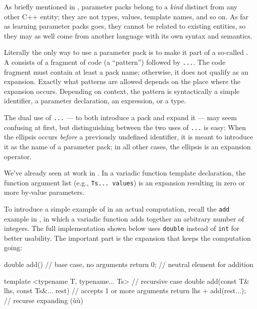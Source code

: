 As briefly mentioned in ,
parameter packs belong to a \emph{kind} distinct from any other C++
entity; they are not types, values, template names, and so on. As far as
learning parameter packs goes, they cannot be related to existing
entities, so they may as well come from another language with its own
syntax and semantics.

Literally the only way to use a parameter pack is to make it part of a
so-called . A  consists of
a fragment of code (a ``pattern'') followed by \lstinline!...!. The code
fragment must contain at least a pack name; otherwise, it does not
qualify as an expansion. Exactly what patterns are allowed depends on
the place where the expansion occurs. Depending on context, the pattern
is syntactically a simple identifier, a parameter declaration, an
expression, or a type.

The dual use of \lstinline!...! --- to both introduce a pack and expand it
--- may seem confusing at first, but distinguishing between the two uses
of \lstinline!...! is easy: When the ellipsis occurs \emph{before} a
previously undefined identifier, it is meant to introduce it as the name
of a parameter pack; in all other cases, the ellipsis is an expansion
operator.

We've already seen  at work in . In a variadic function template
declaration, the function argument list (e.g.,
\lstinline!Ts...!~\lstinline!values!) is an expansion resulting in zero or
more by-value parameters.

To introduce a simple example of  in an actual
computation, recall the \lstinline!add! example in
, in which a variadic function adds
together an arbitrary number of integers. The full implementation shown
below uses \lstinline!double! instead of \lstinline!int! for better usability.
The important part is the expansion that keeps the computation going:

\begin{emcppslisting}
double add()                                 // base case, no arguments
{
    return 0;                                // neutral element for addition
}

template <typename T, typename... Ts>        // recursive case
double add(const T& lhs, const Ts&... rest)  // accepts 1 or more arguments
{
    return lhs + add(rest...);               // recurse expanding (ù{}ù)
}
\end{emcppslisting}
    


